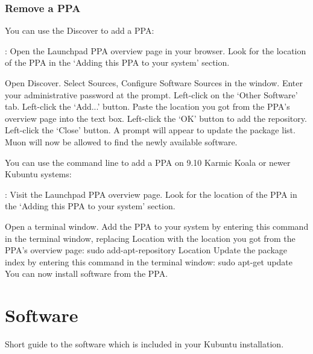 \documentclass[letterpaper,10pt,english]{sphinxmanual}
\begin{document}
\subsection{Remove a PPA}
\label{\detokenize{docs/repositories:remove-a-ppa}}
You can use the Discover to add a PPA:

: Open the Launchpad PPA overview page in your browser. Look for the location of the PPA in the `Adding this PPA to your system' section.

Open Discover. Select Sources, Configure Software Sources in the window. Enter your administrative password at the prompt. Left-click on the `Other Software' tab. Left-click the `Add...' button. Paste the location you got from the PPA's overview page into the text box. Left-click the `OK' button to add the repository. Left-click the `Close' button. A prompt will appear to update the package list. Muon will now be allowed to find the newly available software.

You can use the command line to add a PPA on 9.10 Karmic Koala or newer Kubuntu systems:

: Visit the Launchpad PPA overview page. Look for the location of the PPA in the `Adding this PPA to your system' section.

Open a terminal window. Add the PPA to your system by entering this command in the terminal window, replacing Location with the location you got from the PPA's overview page: sudo add-apt-repository Location Update the package index by entering this command in the terminal window: sudo apt-get update You can now install software from the PPA.


\chapter{Software}
\label{\detokenize{docs/software:software}}\label{\detokenize{docs/software::doc}}\label{\detokenize{docs/software:software-link}}
Short guide to the software which is included in your Kubuntu installation.
\end{document}
